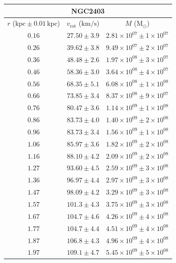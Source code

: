 \documentclass{article}
\newcommand\solmass{\textrm{M}_\odot}
\newcommand\kpc{\textrm{kpc}}
\newcommand\kmps{\textrm{km}/\textrm{s}}
\newcommand\vrot{\ensuremath{v_{\textrm{rot}}}}
\begin{document}
\singlespacing
\begin{table}[h!]
    \begin{tabular}{|c|c|c|}
        \hline
        \multicolumn{3}{|c|}{NGC2403} \\
        \hline
        $r$ ($\kpc \pm 0.01 \,\kpc$) & $\vrot$ ($\kmps$) & $M$ ($\solmass$) \\
        \hline
        $0.16$ & $27.50 \pm 3.9$ & $2.81\times 10^{07} \pm 1\times 10^{07}$ \\
        $0.26$ & $39.62 \pm 3.8$ & $9.49\times 10^{07} \pm 2\times 10^{07}$ \\
        $0.36$ & $48.48 \pm 2.6$ & $1.97\times 10^{08} \pm 3\times 10^{07}$ \\
        $0.46$ & $58.36 \pm 3.0$ & $3.64\times 10^{08} \pm 4\times 10^{07}$ \\
        $0.56$ & $68.35 \pm 5.1$ & $6.08\times 10^{08} \pm 1\times 10^{08}$ \\
        $0.66$ & $73.85 \pm 3.4$ & $8.37\times 10^{08} \pm 9\times 10^{07}$ \\
        $0.76$ & $80.47 \pm 3.6$ & $1.14\times 10^{09} \pm 1\times 10^{08}$ \\
        $0.86$ & $83.73 \pm 4.0$ & $1.40\times 10^{09} \pm 2\times 10^{08}$ \\
        $0.96$ & $83.73 \pm 3.4$ & $1.56\times 10^{09} \pm 1\times 10^{08}$ \\
        $1.06$ & $85.97 \pm 3.6$ & $1.82\times 10^{09} \pm 2\times 10^{08}$ \\
        $1.16$ & $88.10 \pm 4.2$ & $2.09\times 10^{09} \pm 2\times 10^{08}$ \\
        $1.27$ & $93.60 \pm 4.5$ & $2.59\times 10^{09} \pm 3\times 10^{08}$ \\
        $1.36$ & $96.97 \pm 4.4$ & $2.97\times 10^{09} \pm 3\times 10^{08}$ \\
        $1.47$ & $98.09 \pm 4.2$ & $3.29\times 10^{09} \pm 3\times 10^{08}$ \\
        $1.57$ & $101.3 \pm 4.3$ & $3.75\times 10^{09} \pm 3\times 10^{08}$ \\
        $1.67$ & $104.7 \pm 4.6$ & $4.26\times 10^{09} \pm 4\times 10^{08}$ \\
        $1.77$ & $104.7 \pm 4.4$ & $4.51\times 10^{09} \pm 4\times 10^{08}$ \\
        $1.87$ & $106.8 \pm 4.3$ & $4.96\times 10^{09} \pm 4\times 10^{08}$ \\
        $1.97$ & $109.1 \pm 4.7$ & $5.45\times 10^{09} \pm 5\times 10^{08}$ \\

\end{tabular}
\end{table}
\end{document}
